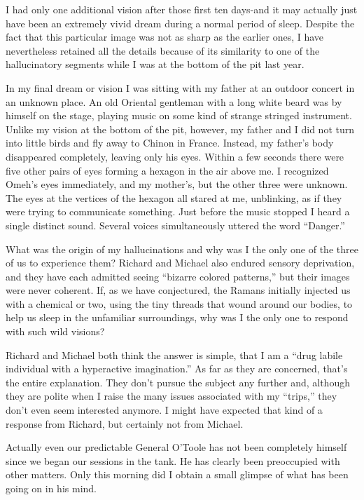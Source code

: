 \documentclass[]{article}
\begin{document}
I had only one additional vision after those first ten days-and it may actually just have been an extremely vivid dream during a normal period of sleep. Despite the fact that this particular image was not as sharp as the earlier ones, I have nevertheless retained all the details because of its similarity to one of the hallucinatory segments while I was at the bottom of the pit last year.

In my final dream or vision I was sitting with my father at an outdoor concert in an unknown place. An old Oriental gentleman with a long white beard was by himself on the stage, playing music on some kind of strange stringed instrument. Unlike my vision at the bottom of the pit, however, my father and I did not turn into little birds and fly away to Chinon in France. Instead, my father’s body disappeared completely, leaving only his eyes. Within a few seconds there were five other pairs of eyes forming a hexagon in the air above me. I recognized Omeh’s eyes immediately, and my mother’s, but the other three were unknown. The eyes at the vertices of the hexagon all stared at me, unblinking, as if they were trying to communicate something. Just before the music stopped I heard a single distinct sound. Several voices simultaneously uttered the word “Danger.”

What was the origin of my hallucinations and why was I the only one of the three of us to experience them? Richard and Michael also endured sensory deprivation, and they have each admitted seeing “bizarre colored patterns,” but their images were never coherent. If, as we have conjectured, the Ramans initially injected us with a chemical or two, using the tiny threads that wound around our bodies, to help us sleep in the unfamiliar surroundings, why was I the only one to respond with such wild visions?

Richard and Michael both think the answer is simple, that I am a “drug labile individual with a hyperactive imagination.” As far as they are concerned, that’s the entire explanation. They don’t pursue the subject any further and, although they are polite when I raise the many issues associated with my “trips,” they don’t even seem interested anymore. I might have expected that kind of a response from Richard, but certainly not from Michael.

Actually even our predictable General O’Toole has not been completely himself since we began our sessions in the tank. He has clearly been preoccupied with other matters. Only this morning did I obtain a small glimpse of what has been going on in his mind.
\end{document}

